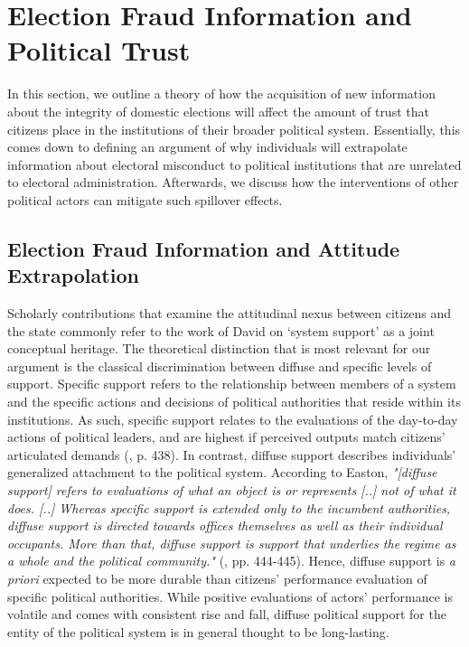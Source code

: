 \documentclass[11pt, ngerman,english,a4]{article}
\begin{document}
\section*{Election Fraud Information and Political Trust}

In this section, we outline a theory of how the acquisition of new information about the integrity of domestic elections will affect the amount of trust that citizens place in the institutions of their broader political system. Essentially, this comes down to defining an argument of why individuals will extrapolate information about electoral misconduct to political institutions that are unrelated to electoral administration. Afterwards, we discuss how the interventions of other political actors can mitigate such spillover effects.

\subsection*{Election Fraud Information and Attitude Extrapolation}

Scholarly contributions that examine the attitudinal nexus between citizens and the state commonly refer to the work of  David \citet{Easton1965, Easton1975} on ‘system support' as a joint conceptual heritage. The theoretical distinction that is most relevant for our argument is the classical discrimination between diffuse and specific levels of support. Specific support refers to the relationship between members of a system and the specific actions and decisions of political authorities that reside within its institutions. As such, specific support relates to the evaluations of the day-to-day actions of political leaders, and are highest if perceived outputs match citizens' articulated demands (\citealt{Easton1975}, p. 438). In contrast, diffuse support describes individuals' generalized attachment to the political system. According to Easton, \textit{"[diffuse support] refers to evaluations of what an object is or represents [..] not of what it does. [..] Whereas specific support is extended only to the incumbent authorities, diffuse support is directed towards offices themselves as well as their individual occupants. More than that, diffuse support is support that underlies the regime as a whole and the political community."} (\citealt{Easton1975}, pp. 444-445). Hence, diffuse support is \textit{a priori} expected to be more durable than citizens' performance evaluation of specific political authorities. While positive evaluations of actors' performance is volatile and comes with consistent rise and fall, diffuse political support for the entity of the political system is in general thought to be long-lasting. 
\end{document}
